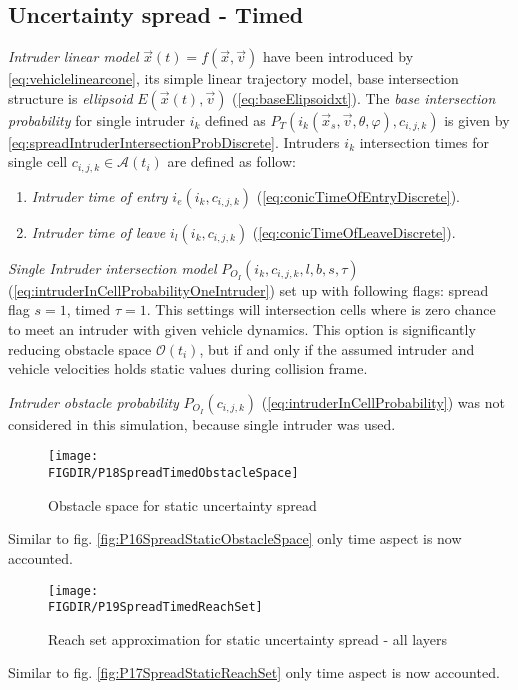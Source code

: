 \subsection{Uncertainty spread - Timed}
\noindent\emph{Intruder linear model} $\vec{x}(t)=f(\vec{x},\vec{v})$ have been introduced by \ref{eq:vehiclelinearcone}, its simple linear trajectory model, base intersection structure is  \emph{ellipsoid} $E(\vec{x}(t),\vec{v})$ (\ref{eq:baseElipsoidxt}). The \emph{base intersection probability} for single intruder $i_k$ defined as $P_T(i_k(\vec{x}_s,\vec{v},\theta,\varphi),c_{i,j,k})$ is given by \ref{eq:spreadIntruderIntersectionProbDiscrete}. Intruders $i_k$ intersection times for single cell $c_{i,j,k}\in\mathscr{A}(t_i)$ are defined as follow:
\begin{enumerate}
    \item\emph{Intruder time of entry} $i_e(i_k,c_{i,j,k})$ (\ref{eq:conicTimeOfEntryDiscrete}).
    \item\emph{Intruder time of leave} $i_l(i_k,c_{i,j,k})$ (\ref{eq:conicTimeOfLeaveDiscrete}).
\end{enumerate}
\emph{Single Intruder intersection model} $ P_{O_I}(i_k,c_{i,j,k},l,b,s,\tau)$ (\ref{eq:intruderInCellProbabilityOneIntruder}) set up with following flags:  spread flag $s=1$, timed $\tau=1$. This settings will intersection cells where is zero chance to meet an intruder with given vehicle dynamics. This option is significantly reducing obstacle space $\mathscr{O}(t_i)$, but if and only if the assumed intruder and vehicle velocities holds static values during collision frame. 

\emph{Intruder obstacle probability} $P_{O_I}(c_{i,j,k})$ (\ref{eq:intruderInCellProbability}) was not considered in this simulation, because single intruder was used. 

\begin{figure}[H]
    \centering
    \texttt{[image: \\FIGDIR/P18SpreadTimedObstacleSpace]}
    \caption{Obstacle space for static uncertainty spread}
    \label{fig:P18SpreadTimedObstacleSpace}
\end{figure}
\noindent  Similar to fig. \ref{fig:P16SpreadStaticObstacleSpace} only time aspect is now accounted.

\begin{figure}[H]
    \centering
    \texttt{[image: \\FIGDIR/P19SpreadTimedReachSet]}
    \caption{Reach set approximation for static uncertainty spread - all layers}
    \label{fig:P19SpreadTimedReachSet}
\end{figure}
\noindent  Similar to fig. \ref{fig:P17SpreadStaticReachSet} only time aspect is now accounted.

